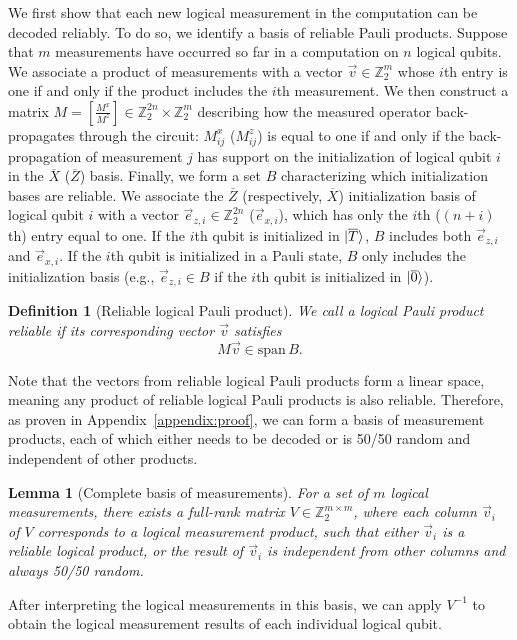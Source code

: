 \documentclass[prx,twocolumn,secnumarabic,balancelastpage,amsmath,amssymb,longbibliography]{revtex4-2}
\newtheorem{lemma}[thm]{Lemma}
\newtheorem{definition}[thm]{Definition}
\newcommand{\lop}[1]{\overline{#1}}
\newcommand{\lket}[1]{\ket{\overline{#1}}}
\newcommand{\nmeas}{m}
\begin{document}
We first show that each new logical measurement in the computation can be decoded reliably. 
%
To do so, we identify a basis of reliable Pauli products.
%
Suppose that $\nmeas$ measurements have occurred so far in a computation on $n$ logical qubits.
%
We associate a product of measurements with a  vector $\vec{v}\in \mathbb{Z}_2^{\nmeas}$ whose $i$th entry is one if and only if the product includes the $i$th measurement.
%
We then construct a matrix $M = \left[\frac{M^x}{M^z}\right]\in \mathbb{Z}_2^{2n}\times \mathbb{Z}_2^{\nmeas}$ describing how the measured operator back-propagates through the circuit: $M^x_{ij}$ ($M^z_{ij}$) is equal to one if and only if the back-propagation of measurement $j$ has support on the initialization of logical qubit $i$ in the $\lop{X}$ ($\lop{Z}$) basis.
%
Finally, we form a set $B$ characterizing which initialization bases are reliable.
%
We associate the $\lop{Z}$ (respectively, $\lop{X}$) initialization basis of logical qubit $i$ with a vector $\vec{e}_{z,i}\in\mathbb{Z}_2^{2n}$ ($\vec{e}_{x,i}$), which has only the $i$th ($(n+i)$th) entry equal to one. 
%
If the $i$th qubit is initialized in $\lket{T}$, $B$ includes both $\vec{e}_{z,i}$ and $\vec{e}_{x,i}$.
%
If the $i$th qubit is initialized in a Pauli state, $B$ only includes the initialization basis (e.g., $\vec{e}_{z,i} \in B$ if the $i$th qubit is initialized in $\lket{0}$).
%
\begin{definition}[Reliable logical Pauli product]
\label{def:reliable_product}
We call a logical Pauli product \textit{reliable} if its corresponding vector $\vec{v}$ satisfies 
\begin{equation}
    M\vec{v} \in \text{span}\,B. \label{eq:nonrandom_operators}
\end{equation}
\end{definition}
\noindent Note that the vectors from reliable logical Pauli products form a linear space, meaning any product of reliable logical Pauli products is also reliable. 
%
Therefore, as proven in Appendix~\ref{appendix:proof}, we can form a basis of measurement products, each of which either needs to be decoded or is 50/50 random and independent of other products. 
\begin{lemma}[Complete basis of measurements]
\label{lemma:complete_basis}
For a set of $\nmeas$ logical measurements, there exists a full-rank matrix $V\in \mathbb{Z}_2^{\nmeas\times \nmeas}$, where each column $\vec{v}_i$ of $V$ corresponds to a logical measurement product, such that either $\vec{v}_i$ is a reliable logical product, or the result of $\vec{v}_i$ is independent from other columns and always 50/50 random.
\end{lemma}
\noindent After interpreting the logical measurements in this basis, we can apply $V^{-1}$ to obtain the logical measurement results of each individual logical qubit.
\end{document}
